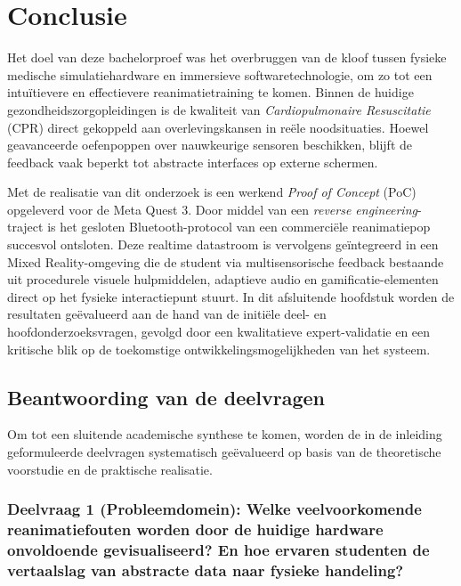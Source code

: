 
\chapter{Conclusie}%
\label{ch:conclusie}


Het doel van deze bachelorproef was het overbruggen van de kloof tussen fysieke medische simulatiehardware en 
immersieve softwaretechnologie, om zo tot een intuïtievere en effectievere reanimatietraining te komen. 
Binnen de huidige gezondheidszorgopleidingen is de kwaliteit van \textit{Cardiopulmonaire Resuscitatie} (CPR) 
direct gekoppeld aan overlevingskansen in reële noodsituaties. Hoewel geavanceerde oefenpoppen over nauwkeurige 
sensoren beschikken, blijft de feedback vaak beperkt tot abstracte interfaces op externe schermen.

Met de realisatie van dit onderzoek is een werkend \textit{Proof of Concept} (PoC) opgeleverd voor de Meta Quest 3. 
Door middel van een \textit{reverse engineering}-traject is het gesloten Bluetooth-protocol van een commerciële 
reanimatiepop succesvol ontsloten. Deze realtime datastroom is vervolgens geïntegreerd in een Mixed Reality-omgeving 
die de student via multisensorische feedback bestaande uit procedurele visuele hulpmiddelen, adaptieve audio en 
gamificatie-elementen direct op het fysieke interactiepunt stuurt. In dit afsluitende hoofdstuk worden de 
resultaten geëvalueerd aan de hand van de initiële deel- en hoofdonderzoeksvragen, gevolgd door een kwalitatieve 
expert-validatie en een kritische blik op de toekomstige ontwikkelingsmogelijkheden van het systeem.
\section{Beantwoording van de deelvragen}

Om tot een sluitende academische synthese te komen, worden de in de inleiding geformuleerde deelvragen systematisch geëvalueerd op basis van de theoretische voorstudie en de praktische realisatie.

\subsection*{Deelvraag 1 (Probleemdomein): Welke veelvoorkomende reanimatiefouten worden door de huidige hardware onvoldoende gevisualiseerd? 
En hoe ervaren studenten de vertaalslag van abstracte data naar fysieke handeling?}

